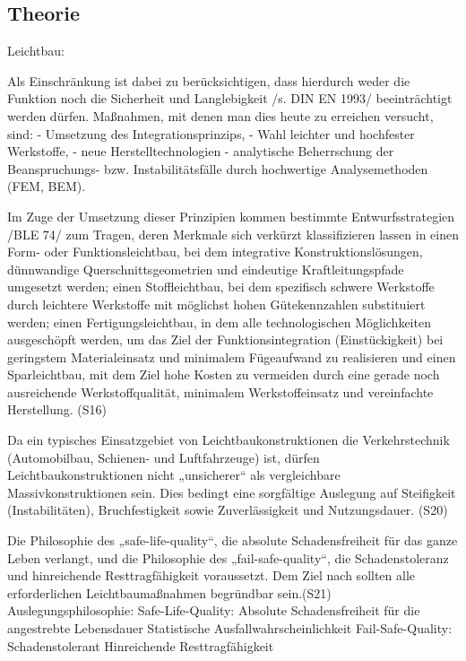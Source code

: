 \subsection{Theorie}
Leichtbau:

Als Einschränkung ist dabei zu berücksichtigen, dass hierdurch weder die Funktion noch die Sicherheit und Langlebigkeit /s. DIN EN 1993/ beeinträchtigt werden dürfen. Maßnahmen, mit denen man dies heute zu erreichen versucht, sind:
- Umsetzung des Integrationsprinzips,
- Wahl leichter und hochfester Werkstoffe,
- neue Herstelltechnologien
- analytische Beherrschung der Beanspruchungs- bzw. Instabilitätsfälle durch hochwertige Analysemethoden (FEM, BEM).

Im Zuge der Umsetzung dieser Prinzipien kommen bestimmte Entwurfsstrategien /BLE 74/ zum Tragen, deren Merkmale sich verkürzt klassifizieren lassen in
  einen Form- oder Funktionsleichtbau, bei dem integrative Konstruktionslösungen, dünnwandige Querschnittsgeometrien und eindeutige Kraftleitungspfade umgesetzt werden;
  einen Stoffleichtbau, bei dem spezifisch schwere Werkstoffe durch leichtere Werkstoffe mit möglichst hohen Gütekennzahlen substituiert werden;
  einen Fertigungsleichtbau, in dem alle technologischen Möglichkeiten ausgeschöpft werden, um das Ziel der Funktionsintegration (Einstückigkeit) bei geringstem Materialeinsatz und minimalem Fügeaufwand zu realisieren
und
  einen Sparleichtbau, mit dem Ziel hohe Kosten zu vermeiden durch eine gerade noch ausreichende Werkstoffqualität, minimalem Werkstoffeinsatz und vereinfachte Herstellung.
(S16)

Da ein typisches Einsatzgebiet von Leichtbaukonstruktionen die Verkehrstechnik (Automobilbau, Schienen- und Luftfahrzeuge) ist, dürfen Leichtbaukonstruktionen nicht „unsicherer“ als vergleichbare Massivkonstruktionen sein. Dies bedingt eine sorgfältige Auslegung auf Steifigkeit (Instabilitäten), Bruchfestigkeit sowie Zuverlässigkeit und Nutzungsdauer. (S20)

Die Philosophie des „safe-life-quality“, die absolute Schadensfreiheit für das ganze Leben verlangt, und die Philosophie des „fail-safe-quality“, die Schadenstoleranz und hinreichende Resttragfähigkeit voraussetzt. Dem Ziel nach sollten alle erforderlichen Leichtbaumaßnahmen begründbar sein.(S21)
Auslegungsphilosophie:
  Safe-Life-Quality:
    Absolute Schadensfreiheit für die angestrebte Lebensdauer
    Statistische Ausfallwahrscheinlichkeit
  Fail-Safe-Quality:
    Schadenstolerant
    Hinreichende Resttragfähigkeit

